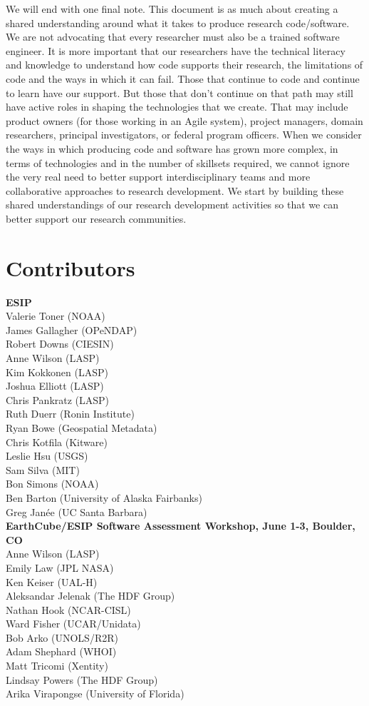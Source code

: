 \documentclass{article}
\begin{document}
We will end with one final note. This document is as much about creating a shared understanding around what it takes to produce research code/software. We are not advocating that every researcher must also be a trained software engineer. It is more important that our researchers have the technical literacy and knowledge to understand how code supports their research, the limitations of code and the ways in which it can fail. Those that continue to code and continue to learn have our support. But those that don’t continue on that path may still have active roles in shaping the technologies that we create. That may include product owners (for those working in an Agile system), project managers, domain researchers, principal investigators, or federal program officers. When we consider the ways in which producing code and software has grown more complex, in terms of technologies and in the number of skillsets required, we cannot ignore the very real need to better support interdisciplinary teams and more collaborative approaches to research development. We start by building these shared understandings of our research development activities so that we can better support our research communities.

\section{Contributors}
\textbf{ESIP}\\
Valerie Toner (NOAA)\\
James Gallagher (OPeNDAP)\\
Robert Downs (CIESIN)\\
Anne Wilson (LASP)\\
Kim Kokkonen (LASP)\\
Joshua Elliott (LASP)\\
Chris Pankratz (LASP)\\
Ruth Duerr (Ronin Institute)\\
Ryan Bowe (Geospatial Metadata)\\
Chris Kotfila (Kitware)\\
Leslie Hsu (USGS)\\
Sam Silva (MIT)\\
Bon Simons (NOAA)\\
Ben Barton (University of Alaska Fairbanks)\\
Greg Janée (UC Santa Barbara)\\
 
\textbf{EarthCube/ESIP Software Assessment Workshop, June 1-3, Boulder, CO}\\
Anne Wilson (LASP)\\
Emily Law (JPL NASA)\\
Ken Keiser (UAL-H)\\
Aleksandar Jelenak (The HDF Group)\\
Nathan Hook (NCAR-CISL)\\
Ward Fisher (UCAR/Unidata)\\
Bob Arko (UNOLS/R2R)\\
Adam Shephard (WHOI)\\
Matt Tricomi (Xentity)\\
Lindsay Powers (The HDF Group)\\
Arika Virapongse (University of Florida)
 
\end{document}
